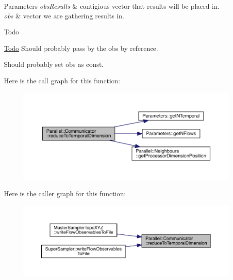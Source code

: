 \begin{DoxyParams}{Parameters}
{\em obs\+Results} & contigious vector that results will be placed in. \\
\hline
{\em obs} & vector we are gathering results in.\\
\hline
\end{DoxyParams}
\begin{DoxyRefDesc}{Todo}
\item[\mbox{\hyperlink{todo__todo000006}{Todo}}]Should probably pass by the obs by reference. 

Should probably set obs as const. \end{DoxyRefDesc}
Here is the call graph for this function\+:
\nopagebreak
\begin{figure}[H]
\begin{center}
\leavevmode
\includegraphics[width=350pt]{class_parallel_1_1_communicator_a5d42989e7a3022de6042e3503aa35346_cgraph}
\end{center}
\end{figure}
Here is the caller graph for this function\+:
\nopagebreak
\begin{figure}[H]
\begin{center}
\leavevmode
\includegraphics[width=350pt]{class_parallel_1_1_communicator_a5d42989e7a3022de6042e3503aa35346_icgraph}
\end{center}
\end{figure}
\mbox{\label{class_parallel_1_1_communicator_a14aa3d54f5efe28094df886948e3dee2}} 
